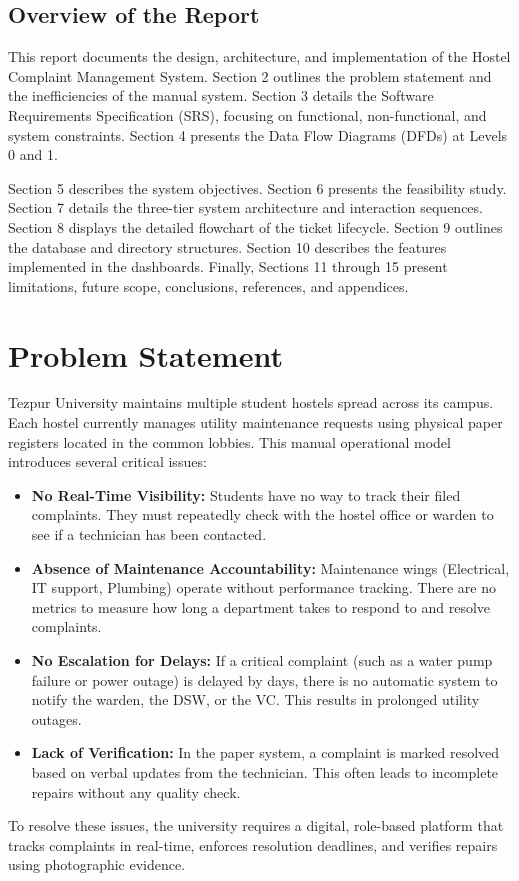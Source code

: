 \documentclass[12pt,a4paper]{article}
\begin{document}
\subsection{Overview of the Report}
This report documents the design, architecture, and implementation of the Hostel Complaint Management System. Section 2 outlines the problem statement and the inefficiencies of the manual system. Section 3 details the Software Requirements Specification (SRS), focusing on functional, non-functional, and system constraints. Section 4 presents the Data Flow Diagrams (DFDs) at Levels 0 and 1. 

Section 5 describes the system objectives. Section 6 presents the feasibility study. Section 7 details the three-tier system architecture and interaction sequences. Section 8 displays the detailed flowchart of the ticket lifecycle. Section 9 outlines the database and directory structures. Section 10 describes the features implemented in the dashboards. Finally, Sections 11 through 15 present limitations, future scope, conclusions, references, and appendices.

\newpage
\section{Problem Statement}
Tezpur University maintains multiple student hostels spread across its campus. Each hostel currently manages utility maintenance requests using physical paper registers located in the common lobbies. This manual operational model introduces several critical issues:
\begin{itemize}
    \item \textbf{No Real-Time Visibility:} Students have no way to track their filed complaints. They must repeatedly check with the hostel office or warden to see if a technician has been contacted.
    \item \textbf{Absence of Maintenance Accountability:} Maintenance wings (Electrical, IT support, Plumbing) operate without performance tracking. There are no metrics to measure how long a department takes to respond to and resolve complaints.
    \item \textbf{No Escalation for Delays:} If a critical complaint (such as a water pump failure or power outage) is delayed by days, there is no automatic system to notify the warden, the DSW, or the VC. This results in prolonged utility outages.
    \item \textbf{Lack of Verification:} In the paper system, a complaint is marked resolved based on verbal updates from the technician. This often leads to incomplete repairs without any quality check.
\end{itemize}
To resolve these issues, the university requires a digital, role-based platform that tracks complaints in real-time, enforces resolution deadlines, and verifies repairs using photographic evidence.
\end{document}

